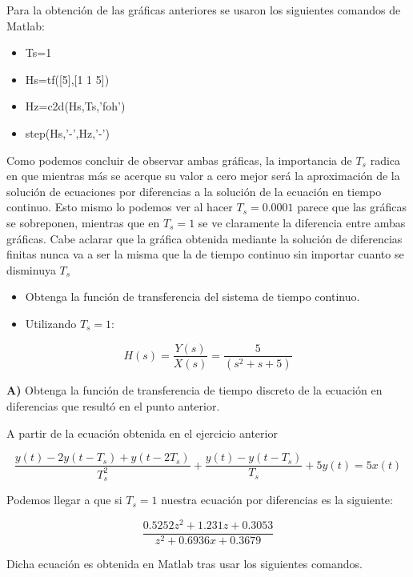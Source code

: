 Para la obtención de las gráficas anteriores se usaron los siguientes comandos de Matlab:

\begin{itemize}
\item Ts=1
\item Hs=tf([5],[1 1 5])
\item Hz=c2d(Hs,Ts,'foh')
\item step(Hs,'-',Hz,'-')
\end{itemize}


Como podemos concluir de observar ambas gráficas, la importancia de $T_s$ radica en que mientras más se acerque su valor a cero mejor será la aproximación de la solución de ecuaciones por diferencias a la solución de la ecuación en tiempo continuo. Esto mismo lo podemos ver al hacer $T_s=0.0001$ parece que las gráficas se sobreponen, mientras que en $T_s=1$ se ve claramente la diferencia entre ambas gráficas. Cabe aclarar que la gráfica obtenida mediante la solución de diferencias finitas nunca va a ser la misma que la de tiempo continuo sin importar cuanto se disminuya $T_s$

\begin{itemize}
	\item Obtenga la función de transferencia del sistema de tiempo continuo.
	\item Utilizando $ T_s = 1 $:
\end{itemize}

\begin{equation}
	H(s)=\frac{Y(s)}{X(s)}=\frac{5}{(s^2+s+5)}
\end{equation}


\textbf{A)} Obtenga la función de transferencia de tiempo discreto de la ecuación en diferencias que resultó en	el punto anterior.

A partir de la ecuación obtenida en el ejercicio anterior

\begin{equation}
	\frac{y(t)-2y(t-T_s)+y(t-2T_s)}{T_s^2}+\frac{y(t)-y(t-T_s)}{T_s}+5y(t)=5x(t)
\end{equation}

Podemos llegar a que si $T_s=1$ nuestra ecuación por diferencias es la siguiente:



\begin{equation}
	\frac{0.5252z^2+1.231z+0.3053}{z^2 +0.6936x + 0.3679}
\end{equation}

Dicha ecuación es obtenida en Matlab tras usar los siguientes comandos.

